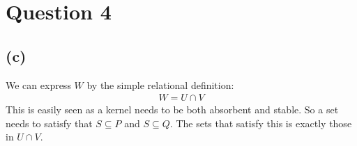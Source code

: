 \documentclass[a4paper, fleqn]{article}
\begin{document}
\section*{Question 4}
\subsection*{(c)}
We can express $W$ by the simple relational definition:
\begin{align*}
  W = U\cap V
\end{align*}
This is easily seen as a kernel needs to be both absorbent and stable. So a set needs to
satisfy that $S\subseteq P$ and $S\subseteq Q$. The sets that satisfy this is exactly
those in $U\cap V$.
\end{document}
